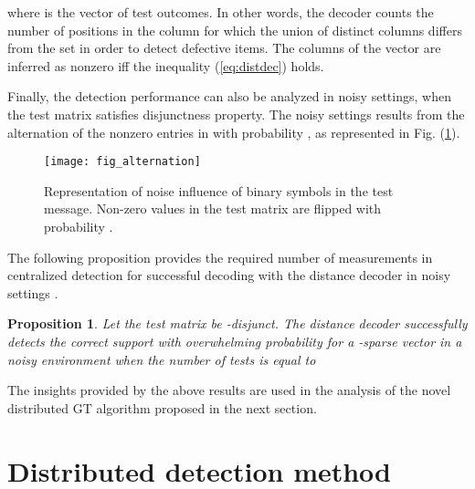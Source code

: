 \documentclass[journal]{IEEEtran}
\newtheorem{prop}{Proposition}
\begin{document}
where  is the vector of test outcomes. In other words, the decoder counts the number of positions in the column  for which the union of distinct columns differs from the set  in order to detect defective items. The columns of the vector  are inferred as nonzero iff the inequality (\ref{eq:distdec}) holds.

Finally, the detection performance can also be analyzed in noisy settings, when the test matrix satisfies disjunctness property. The noisy settings results from the alternation of the nonzero entries in  with probability , as represented in Fig. (\ref{fig:noise_bit_alternation}). 
\begin{figure}[h!]
\begin{center}
\texttt{[image: fig\_alternation]}
\end{center}
\caption{\label{fig:noise_bit_alternation}Representation of noise influence of binary symbols in the test message. Non-zero values in the test matrix are flipped with probability .}
\end{figure}



The following proposition provides the required number of measurements in centralized detection for successful decoding with the distance decoder in noisy settings \cite{Cheraghchi:11}.
\begin{prop}\label{th:nummeasur} 
Let the test matrix  be -disjunct. The distance decoder successfully detects the correct support with overwhelming probability for a -sparse vector  in a noisy environment when the number of tests is equal to 

\end{prop}
The insights provided by the above results are used in the analysis of the novel distributed GT algorithm proposed in the next section.

\section{Distributed detection method}\label{sec:decoder}
\end{document}
